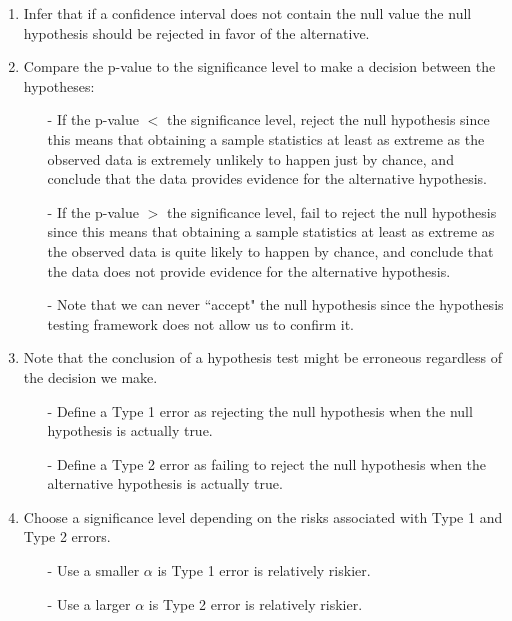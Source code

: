 \documentclass[11pt]{article}
\begin{document}
\begin{enumerate}[resume]
\item Infer that if a confidence interval does not contain the null value the null hypothesis should be rejected in favor of the alternative.

\item Compare the p-value to the significance level to make a decision between the hypotheses:
\begin{itemize}
\item[-] If the p-value $<$ the significance level, reject the null hypothesis since this means that obtaining a sample statistics at least as extreme as the observed data is extremely unlikely to happen just by chance, and conclude that the data provides evidence for the alternative hypothesis.
\item[-] If the p-value $>$ the significance level, fail to reject the null hypothesis since this means that obtaining a sample statistics at least as extreme as the observed data is quite likely to happen by chance, and conclude that the data does not provide evidence for the alternative hypothesis.
\item[-] Note that we can never ``accept" the null hypothesis since the hypothesis testing framework does not allow us to confirm it.
\end{itemize}

\item Note that the conclusion of a hypothesis test might be erroneous regardless of the decision we make.
\begin{itemize}
\item[-] Define a Type 1 error as rejecting the null hypothesis when the null hypothesis is actually true.
\item[-] Define a Type 2 error as failing to reject the null hypothesis when the alternative hypothesis is actually true.
\end{itemize}

\item Choose a significance level depending on the risks associated with Type 1 and Type 2 errors.
\begin{itemize}
\item[-] Use a smaller $\alpha$ is Type 1 error is relatively riskier.
\item[-] Use a larger $\alpha$ is Type 2 error is relatively riskier.
\end{itemize}


\end{enumerate}
\end{document}
